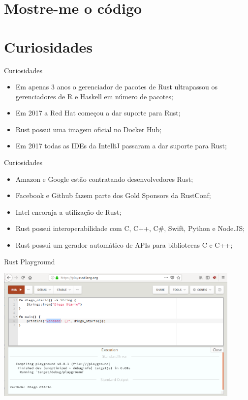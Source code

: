 \documentclass[aspectratio=169]{beamer}
\begin{document}
\section{Mostre-me o código}

\section{Curiosidades}

\begin{frame}{Curiosidades}
	\begin{itemize}
		\item Em apenas 3 anos o gerenciador de pacotes de Rust ultrapassou os gerenciadores de R e Haskell em número de pacotes;
		\item Em 2017 a Red Hat começou a dar suporte para Rust;
		\item Rust possui uma imagem oficial no Docker Hub;
		\item Em 2017 todas as IDEs da IntelliJ passaram a dar suporte para Rust;
	\end{itemize}
\end{frame}

\begin{frame}{Curiosidades}
	\begin{itemize}
		\item Amazon e Google estão contratando desenvolvedores Rust;
		\item Facebook e Github fazem parte dos Gold Sponsors da RustConf;
		\item Intel encoraja a utilização de Rust;
		\item Rust possui interoperabilidade com C, C++, C\#, Swift, Python e Node.JS;
		\item Rust possui um gerador automático de APIs para bibliotecas C e C++;
	\end{itemize}
\end{frame}

\begin{frame}{Rust Playground}
	\begin{center}
		\includegraphics[width=12.0cm]{imgs/playground.png}	
	\end{center}
\end{frame}
\end{document}
